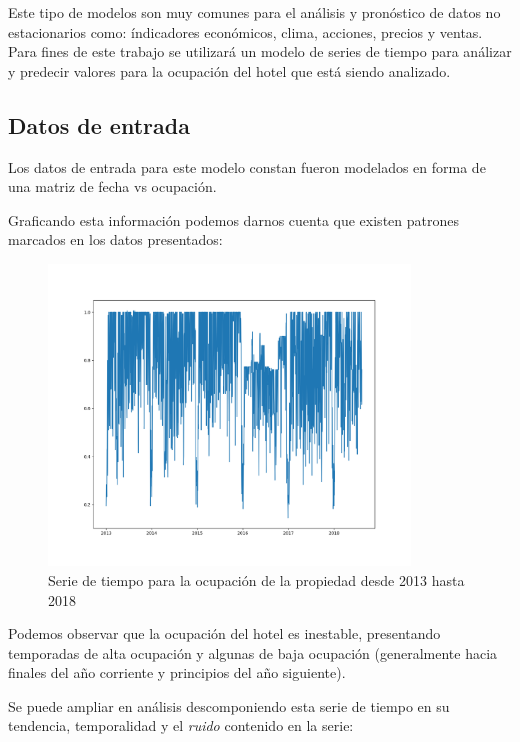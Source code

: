 Este tipo de modelos son muy comunes para el análisis y pronóstico de datos no estacionarios como: índicadores económicos, clima, acciones, precios y ventas. Para fines de este trabajo se utilizará un modelo de series de tiempo para análizar y predecir valores para la ocupación del hotel que está siendo analizado.

\subsection*{Datos de entrada}

Los datos de entrada para este modelo constan fueron modelados en forma de una matriz de fecha vs ocupación.

Graficando esta información podemos darnos cuenta que existen patrones marcados en los datos presentados:

\begin{figure}[H]
  \centering
      \includegraphics[width=\maxwidth,height=8cm]{figures/TsOcc.png}    
  \caption{Serie de tiempo para la ocupación de la propiedad desde 2013 hasta 2018}
\end{figure}

Podemos observar que la ocupación del hotel es inestable, presentando temporadas de alta ocupación y algunas de baja ocupación (generalmente hacia finales del año corriente y principios del año siguiente).

Se puede ampliar en análisis descomponiendo esta serie de tiempo en su tendencia, temporalidad y el \emph{ruido} contenido en la serie:

